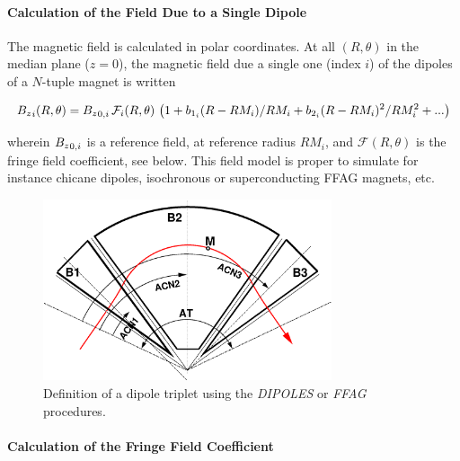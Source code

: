 \bigskip

\paragraph{Calculation of the Field Due to a Single Dipole} 

 \noindent The magnetic field is calculated in  polar
coordinates.  At all $(R,\theta)$ in the median plane ($z=0$), the 
magnetic field  due  a single one (index $i$) of the  dipoles  of a $N$-tuple   magnet is written 

\begin{equation}
{B_z}_i(R,\theta) =  {B_z}_{0,i} \, \mathcal{F}_i(R,\theta) \, 
\left( 1 +  b_{1_i} (R-RM_{i})/RM_{i} + b_{2_i} (R-RM_{i})^2/RM_{i}^2 +... \right)
\label{EqFieldDipoles}
\end{equation}

\noindent wherein ${B_z}_{0,i}$  is a reference field, at reference radius  $RM_{i}$, 
 and $ \mathcal{F}(R,\theta)$ is the fringe field coefficient, see below. 
This field model is proper to simulate for instance chicane dipoles, isochronous 
or superconducting FFAG magnets, etc. 


\begin{figure}[h]
 \begin{center}
\includegraphics[width=8.5cm]{ffagTriplet.eps}  
 \caption{ \label{figDFD}
Definition of a dipole triplet using  the \textsl{DIPOLES} or  \textsl{FFAG}  procedures. 
}
  \end{center}
\end{figure}





\paragraph{Calculation of the Fringe Field Coefficient} 

